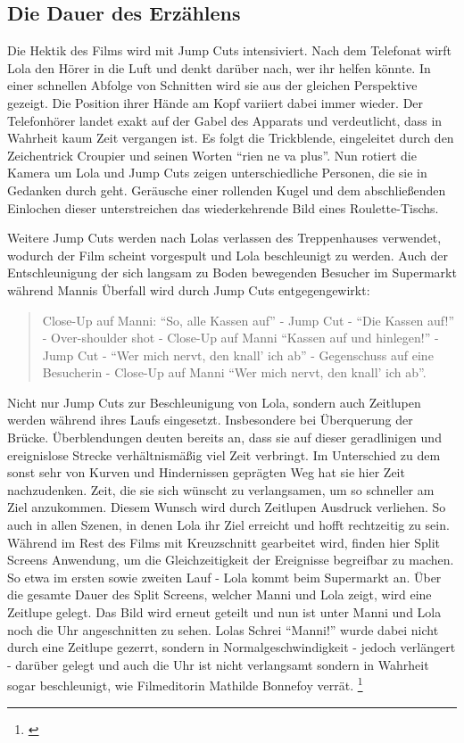 \subsection{Die Dauer des Erzählens}

Die Hektik des Films wird mit Jump Cuts intensiviert. Nach dem Telefonat wirft Lola den Hörer in die Luft und denkt darüber nach, wer ihr helfen könnte. In einer schnellen Abfolge von Schnitten wird sie aus der gleichen Perspektive gezeigt. Die Position ihrer Hände am Kopf variiert dabei immer wieder. Der Telefonhörer landet exakt auf der Gabel des Apparats und verdeutlicht, dass in Wahrheit kaum Zeit vergangen ist. Es folgt die Trickblende, eingeleitet durch den Zeichentrick Croupier und seinen Worten "`ri­en ne va plus"'. Nun rotiert die Kamera um Lola und Jump Cuts zeigen unterschiedliche Personen, die sie in Gedanken durch geht. Geräusche einer rollenden Kugel und dem abschließenden Einlochen dieser unterstreichen das wiederkehrende Bild eines Roulette-Tischs.

Weitere Jump Cuts werden nach Lolas verlassen des Treppenhauses verwendet, wodurch der Film scheint vorgespult und Lola beschleunigt zu werden. Auch der Entschleunigung der sich langsam zu Boden bewegenden Besucher im Supermarkt während Mannis Überfall wird durch Jump Cuts entgegengewirkt:

\begin{quote}
Close-Up auf Manni: "`So, alle Kassen auf"' - Jump Cut - "`Die Kassen auf!"' - Over-shoulder shot - Close-Up auf Manni "`Kassen auf und hinlegen!"' - Jump Cut - "`Wer mich nervt, den knall' ich ab"' - Gegenschuss auf eine Besucherin - Close-Up auf Manni "`Wer mich nervt, den knall' ich ab"'.
\end{quote}

Nicht nur Jump Cuts zur Beschleunigung von Lola, sondern auch Zeitlupen werden während ihres Laufs eingesetzt. Insbesondere bei Überquerung der Brücke. Überblendungen deuten bereits an, dass sie auf dieser geradlinigen und ereignislose Strecke verhältnismäßig viel Zeit verbringt. Im Unterschied zu dem sonst sehr von Kurven und Hindernissen geprägten Weg hat sie hier Zeit nachzudenken. Zeit, die sie sich wünscht zu verlangsamen, um so schneller am Ziel anzukommen. Diesem Wunsch wird durch Zeitlupen Ausdruck verliehen. So auch in allen Szenen, in denen Lola ihr Ziel erreicht und hofft rechtzeitig zu sein. Während im Rest des Films mit Kreuzschnitt gearbeitet wird, finden hier Split Screens Anwendung, um die Gleichzeitigkeit der Ereignisse begreifbar zu machen. So etwa im ersten sowie zweiten Lauf - Lola kommt beim Supermarkt an. Über die gesamte Dauer des Split Screens, welcher Manni und Lola zeigt, wird eine Zeitlupe gelegt. Das Bild wird erneut geteilt und nun ist unter Manni und Lola noch die Uhr angeschnitten zu sehen. Lolas Schrei "`Manni!"' wurde dabei nicht durch eine Zeitlupe gezerrt, sondern in Normalgeschwindigkeit - jedoch verlängert - darüber gelegt und auch die Uhr ist nicht verlangsamt sondern in Wahrheit sogar beschleunigt, wie Filmeditorin Mathilde Bonnefoy verrät.  \footnote{\cite[S. 5]{DIEDRINGLICHKEITDERLIEBE}} 

